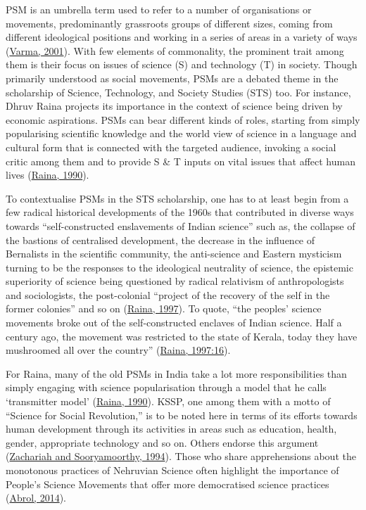\documentclass[twoside, 13pt]{article}
\begin{document}
{\fontsize{12}{14}\selectfont PSM is an umbrella term used to refer to a number of organisations or movements, predominantly grassroots groups of different sizes, coming from different ideological positions and working in a series of areas in a variety of ways (\underline{Varma, 2001}). With few elements of commonality, the prominent trait among them is their focus on issues of science (S) and technology (T) in society. Though primarily understood as social movements, PSMs are a debated theme in the scholarship of Science, Technology, and Society Studies (STS) too. For instance, Dhruv Raina projects its importance in the context of science being driven by economic aspirations. PSMs can bear different kinds of roles, starting from simply popularising scientific knowledge and the world view of science in a language and cultural form that is connected with the targeted audience, invoking a social critic among them and to provide S \& T inputs on vital issues that affect human lives (\underline{Raina, 1990}). 

To contextualise PSMs in the STS scholarship, one has to at least begin from a few radical historical developments of the 1960s that contributed in diverse ways towards “self-constructed enslavements of Indian science” such as, the collapse of the bastions of centralised development, the decrease in the influence of Bernalists in the scientific community, the anti-science and Eastern mysticism turning to be the responses to the ideological neutrality of science, the epistemic superiority of science being questioned by radical relativism of anthropologists and sociologists, the post-colonial “project of the recovery of the self in the former colonies” and so on (\underline{Raina, 1997}). To quote, “the peoples' science movements broke out of the self-constructed enclaves of Indian science. Half a century ago, the movement was restricted to the state of Kerala, today they have mushroomed all over the country” (\underline{Raina, 1997:16}).


For Raina, many of the old PSMs in India take a lot more responsibilities than simply engaging with science popularisation through a model that he calls ‘transmitter model’ (\underline{Raina, 1990}). KSSP, one among them with a motto of “Science for Social Revolution,” is to be noted here in terms of its efforts towards human development through its activities in areas such as education, health, gender, appropriate technology and so on. Others endorse this argument (\underline{Zachariah and Sooryamoorthy, 1994}). Those who share apprehensions about the monotonous practices of Nehruvian Science often highlight the importance of People’s Science Movements that offer more democratised science practices (\underline{Abrol, 2014}).

}
\end{document}
